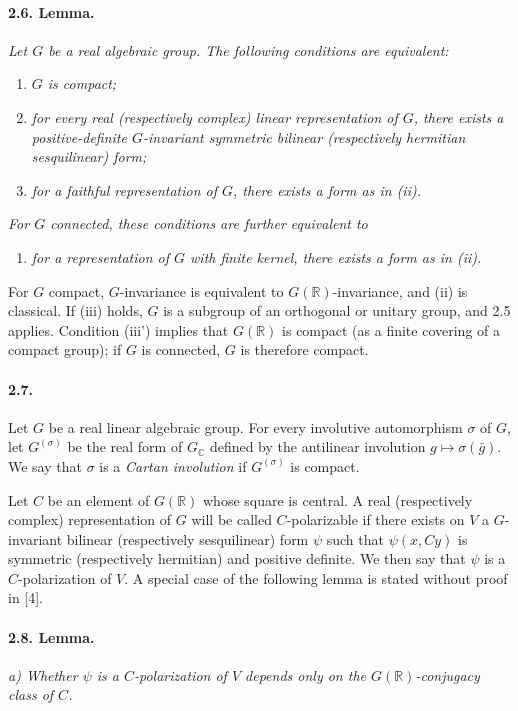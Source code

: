 \documentclass[10pt,leqno]{article}
\newcommand{\C}{\mathbb{C}}
\newcommand{\R}{\mathbb{R}}
\begin{document}
\paragraph{2.6. Lemma.} \emph{Let $G$ be a real algebraic group. The following conditions are equivalent:}
\begin{enumerate}[label=(\roman*)]
\item \emph{$G$ is compact;}
\item \emph{for every real (respectively complex) linear representation of $G$, there exists a positive-definite $G$-invariant symmetric bilinear (respectively hermitian sesquilinear) form;}
\item \emph{for a faithful representation of $G$, there exists a form as in (ii).}
\end{enumerate}
\emph{For $G$ connected, these conditions are further equivalent to}
\begin{enumerate}[label=(iii\textquotesingle)]
\item \emph{for a representation of $G$ with finite kernel, there exists a form as in (ii).}
\end{enumerate}

For $G$ compact, $G$-invariance is equivalent to $G(\R)$-invariance, and (ii) is classical. If (iii) holds, $G$ is a subgroup of an orthogonal or unitary group, and 2.5 applies. Condition (iii') implies that $G(\R)$ is compact (as a finite covering of a compact group); if $G$ is connected, $G$ is therefore compact.

\paragraph{2.7.} Let $G$ be a real linear algebraic group. For every involutive automorphism $\sigma$ of $G$, let $G^{(\sigma)}$ be the real form of $G_\C$ defined by the antilinear involution $g\mapsto\sigma(\bar g)$. We say that $\sigma$ is a \emph{Cartan involution} if $G^{(\sigma)}$ is compact.

Let $C$ be an element of $G(\R)$ whose square is central. A real (respectively complex) representation of $G$ will be called \mbox{$C$-polarizable} if there exists on $V$ a $G$-invariant bilinear (respectively sesquilinear) form $\psi$ such that $\psi(x,Cy)$ is symmetric (respectively hermitian) and positive definite. We then say that $\psi$ is a $C$-polarization of $V$. A special case of the following lemma is stated without proof in [4].

\paragraph{2.8. Lemma.} \emph{a) Whether $\psi$ is a $C$-polarization of $V$ depends only on the $G(\R)$-conjugacy class of $C$.}
\end{document}
